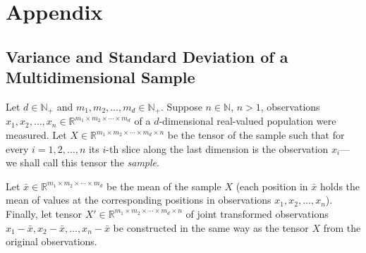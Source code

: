 \documentclass[conference, a4paper, 12pt]{IEEEtran}
\newcommand*{\positives}[1]{{#1}_{{+}}}
\newcommand*{\naturals}{\mathbb{N}}
\newcommand*{\reals}{\mathbb{R}}
\newcommand*{\mean}[1]{\bar{#1}}
\begin{document}
    \par

    \section{Appendix}
    \label{sec:appendix}

    \subsection{Variance and Standard Deviation of a Multidimensional Sample}
    \label{subsec:variance_and_standard_deviation_of_a_multidimensional_sample}

    Let $ d \in \positives{\naturals} $ and $ m_{1} , m_{2} , \dotsc , m_{d} \in \positives{\naturals} $. Suppose $ n \in \naturals $, $ n > 1 $, observations $ x_{1} , x_{2} , \dotsc , x_{n} \in \reals^{m_{1} \times m_{2} \times \dotsb \times m_{d}} $ of a $ d $-dimensional real-valued population were measured. Let $ X \in \reals^{m_{1} \times m_{2} \times \dotsb \times m_{d} \times n} $ be the tensor of the sample such that for every $ i = 1 , 2 , \dotsc , n $ its $ i $-th slice along the last dimension is the observation $ x_{i} $---we shall call this tensor the \emph{sample}.

    \par

    Let $ \mean{x} \in \reals^{m_{1} \times m_{2} \times \dotsb \times m_{d}} $ be the mean of the sample $ X $ (each position in $ \mean{x} $ holds the mean of values at the corresponding positions in observations $ x_{1} , x_{2} , \dotsc , x_{n} $). Finally, let tensor $ X ' \in \reals^{m_{1} \times m_{2} \times \dotsb \times m_{d} \times n} $ of joint transformed observations $ x_{1} - \mean{x} , x_{2} - \mean{x} , \dotsc , x_{n} - \mean{x} $ be constructed in the same way as the tensor $ X $ from the original observations.

    \par
\end{document}
